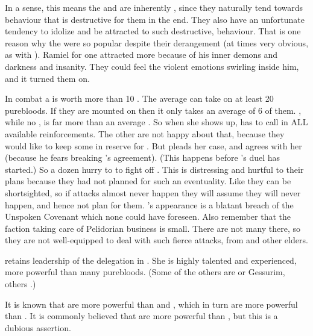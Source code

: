 In a sense, this means the \resphain and \dragons are inherently , since they naturally tend towards behaviour that is destructive for them in the end.
They also have an unfortunate tendency to idolize and be attracted to such destructive,  behaviour.
That is one reason why the \satharioth were so popular despite their derangement (at times very obvious, as with \Zachirah). 
Ramiel for one attracted more \resviel because of his inner demons and darkness and insanity.
They could feel the violent emotions swirling inside him, and it turned them on.

In combat a \dragon is worth more than 10 \resphain. 
The average \dragon can take on at least 20 purebloods. 
If they are mounted on \umbrae then it only takes an average of 6 of them.
\Nzessuacrith, while no \shaeeroth, is far more than an average \dragon.
So when she shows up, \Achsah has to call in ALL available reinforcements.
The other \resphain are not happy about that, because they would like to keep some in reserve for \Ishnaruchaefir.
But \Achsah pleads her case, and \Teshrial agrees with her (because he fears breaking \Ishnaruchaefir's agreement).
(This happens before \Teshrial's duel has started.)
So a dozen \resphain hurry to \Forklin to fight off \Nzessuacrith. 
This is distressing and hurtful to their plans because they had not planned for such an eventuality. 
Like \humans they can be shortsighted, so if \dragon attacks almost never happen they will assume they will never happen, and hence not plan for them. 
\Nzessuacrith's appearance is a blatant breach of the Unspoken Covenant which none could have foreseen.
Also remember that the faction taking care of Pelidorian business is small. 
There are not many \resphain there, so they are not well-equipped to deal with such fierce \dragon attacks, from \shaeeroth and other elders.

\Achsah retains leadership of the delegation in \Forklin. 
She is highly talented and experienced, more powerful than many purebloods.
(Some of the others are \thelyadeth or Gessurim, others \bezedeth.)

It is known that \satharioth are more powerful than \ketherain and \thelyadeth, which in turn are more powerful than \bezedeth. 
It is commonly believed that \ketherain are more powerful than \thelyadeth, but this is a dubious assertion.

